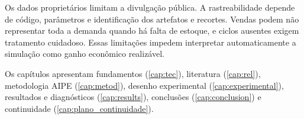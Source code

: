 Os dados proprietários limitam a divulgação pública. A rastreabilidade depende de código, parâmetros e identificação dos artefatos e recortes. Vendas podem não representar toda a demanda quando há falta de estoque, e ciclos ausentes exigem tratamento cuidadoso. Essas limitações impedem interpretar automaticamente a simulação como ganho econômico realizável.

Os capítulos apresentam fundamentos (\ref{cap:tec}), literatura (\ref{cap:rel}), metodologia AIPE (\ref{cap:metod}), desenho experimental (\ref{cap:experimental}), resultados e diagnósticos (\ref{cap:results}), conclusões (\ref{cap:conclusion}) e continuidade (\ref{cap:plano_continuidade}).

\newpage\lhead{\rightmark}
